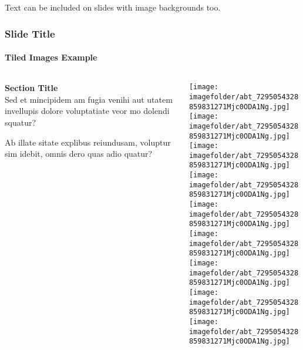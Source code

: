 \documentclass[
	aspectratio=169, %
	t, %
	onlytextwidth, %
	10pt, %
]{beamer}
\def\imagefolder{../ImperialTheme/Images/}
\begin{document}
\begingroup
	
	\begin{frame}
		Text can be included on slides with image backgrounds too.
	\end{frame}
\endgroup


\begin{frame}
	\frametitle{Slide Title}
	\framesubtitle{Tiled Images Example}
	
	\small %
	
	\begin{columns}[T] %
		\begin{column}{0.3\linewidth} %
			\textbf{Section Title}\\
			Sed et mincipidem am fugia venihi aut utatem invellupis dolore voluptatiate veor mo dolendi squatur?

			Ab illate sitate explibus reiundusam, voluptur sim idebit, omnis dero quas adio quatur?
		\end{column}
		\begin{column}{0.68\linewidth} %
			\vspace{-3.5\baselineskip} %
			
			\texttt{[image: \\imagefolder/abt\_7295054328859831271Mjc0ODA1Ng.jpg]}\hfill\texttt{[image: \\imagefolder/abt\_7295054328859831271Mjc0ODA1Ng.jpg]}\hfill\texttt{[image: \\imagefolder/abt\_7295054328859831271Mjc0ODA1Ng.jpg]}\\[6pt]
			\texttt{[image: \\imagefolder/abt\_7295054328859831271Mjc0ODA1Ng.jpg]}\hfill\texttt{[image: \\imagefolder/abt\_7295054328859831271Mjc0ODA1Ng.jpg]}\hfill\texttt{[image: \\imagefolder/abt\_7295054328859831271Mjc0ODA1Ng.jpg]}\\[6pt]
			\texttt{[image: \\imagefolder/abt\_7295054328859831271Mjc0ODA1Ng.jpg]}\hfill\texttt{[image: \\imagefolder/abt\_7295054328859831271Mjc0ODA1Ng.jpg]}\hfill\texttt{[image: \\imagefolder/abt\_7295054328859831271Mjc0ODA1Ng.jpg]}\par
		\end{column}
	\end{columns}
\end{frame}
\end{document}
